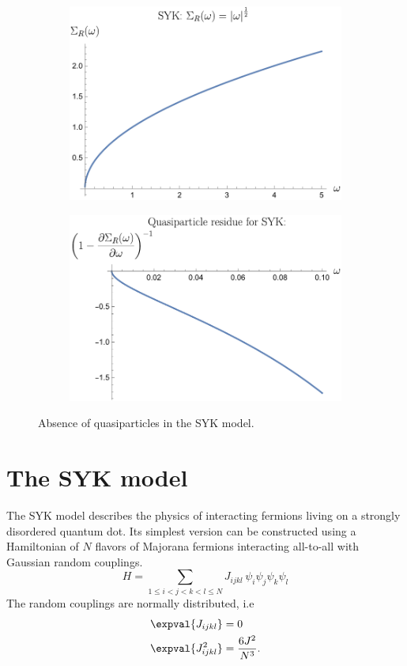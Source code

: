 \begin{figure}
    \centering
    \begin{subfigure}[b]{0.4\textwidth}
    \centering
    \includegraphics[width = \textwidth]{figures/introduction/SYKS.pdf}
    \end{subfigure}
    \begin{subfigure}[b]{0.4\textwidth}
    \centering
    \includegraphics[width = \textwidth]{figures/introduction/SYKZ.pdf}
    \end{subfigure}
    \caption{Absence of quasiparticles in the SYK model.}
    \label{fig:SYKZ}
\end{figure}

\section{The SYK model}
The SYK model describes the physics of interacting fermions living on a strongly disordered quantum dot. Its simplest version can be constructed using a Hamiltonian of $N$ flavors of Majorana fermions interacting all-to-all with Gaussian random couplings. 
\begin{equation}
    H = \displaystyle \sum_{1\leq i<j<k<l\leq N} J_{ijkl}\,\psi_i\psi_j\psi_k\psi_l
\end{equation}
The random couplings are normally distributed, i.e 
\begin{align}
    \expval{J_{ijkl}} &= 0 \\
    \expval{J^2_{ijkl}} &= \frac{6 J^2}{N^3}.
\end{align}


